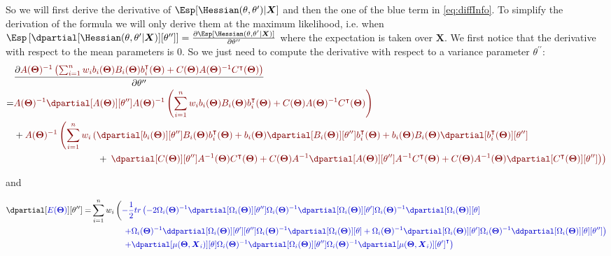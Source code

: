 \documentclass[12pt]{article}
\newcommand{\darkblue}{blue!80!black}
\newcommand{\darkred}{red!50!black}
\newcommand\trans[1]{{#1}^\intercal}%
\newcommand{\param}{\Theta}
\newcommand{\Vparam}{\boldsymbol{\param}}
\newcommand{\VX}{\boldsymbol{X}}
\begin{document}
So we will first derive the derivative of
\(\Esp[\Hessian(\theta,\theta^{\prime})|\VX]\) and then the one of the
blue term in \autoref{eq:diffInfo}.  To simplify the derivation of the
formula we will only derive them at the maximum likelihood, i.e. when
\(\Esp\left[\dpartial[\Hessian(\theta,\theta^{\prime}|\VX)][\theta^{\prime\prime}]\right]=\frac{\partial
\Esp[\Hessian(\theta,\theta^{\prime}|\VX)]}{\partial
\theta^{\prime\prime}}\) where the expectation is taken over
\(\VX\). We first notice that the derivative with respect to the mean
parameters is 0. So we just need to compute the derivative with
respect to a variance parameter \(\theta^{\prime\prime}\):
\begin{align*}
 & \frac{\partial \textcolor{\darkred}{ A(\Vparam)^{-1} \left(\sum_{i=1}^n w_i b_i(\Vparam) B_i(\Vparam) \trans{b}_i(\Vparam) + C(\Vparam)A(\Vparam)^{-1} \trans{C}(\Vparam) \right)}}{\partial \theta^{\prime\prime}} \\
 =& \textcolor{\darkred}{A(\Vparam)^{-1} \dpartial[A(\Vparam)][\theta^{\prime\prime}] A(\Vparam)^{-1} \left(\sum_{i=1}^n w_i b_i(\Vparam) B_i(\Vparam) \trans{b}_i(\Vparam) + C(\Vparam)A(\Vparam)^{-1} \trans{C}(\Vparam) \right)} \\
 & +\textcolor{\darkred}{A(\Vparam)^{-1} \left(\sum_{i=1}^n w_i \left(
 \dpartial[b_i(\Vparam)][\theta^{\prime\prime}]  B_i(\Vparam) \trans{b}_i(\Vparam)
 + b_i(\Vparam) \dpartial[B_i(\Vparam)][\theta^{\prime\prime}]   \trans{b}_i(\Vparam)
 + b_i(\Vparam) B_i(\Vparam) \dpartial[\trans{b}_i(\Vparam)][\theta^{\prime\prime}] \right. \right. } \\
& \qquad \qquad \qquad \qquad \quad + \textcolor{\darkred}{\left. \left.
 \dpartial[C(\Vparam)][\theta^{\prime\prime}]  A^{-1}(\Vparam) \trans{C}(\Vparam)
 + C(\Vparam) A^{-1}\dpartial[A(\Vparam)][\theta^{\prime\prime}]A^{-1}   \trans{C}(\Vparam)
 + C(\Vparam) A^{-1}(\Vparam) \dpartial[\trans{C}(\Vparam)][\theta^{\prime\prime}]
\right) \right)}
\end{align*}

and

\begin{align*}
 \dpartial[\textcolor{\darkblue}{E(\Vparam)}][\theta^{\prime\prime}]=&
 \sum_{i=1}^n w_i \left( \textcolor{\darkblue}{
- \frac{1}{2} tr\left(
-2\Omega_i(\Vparam)^{-1} \dpartial[\Omega_i(\Vparam)][\theta^{\prime\prime}] \Omega_i(\Vparam)^{-1} \dpartial[\Omega_i(\Vparam)][\theta^{\prime}] \Omega_i(\Vparam)^{-1} \dpartial[\Omega_i(\Vparam)][\theta] \right. } \right. \\
& \qquad \qquad \textcolor{\darkblue}{\left. + \Omega_i(\Vparam)^{-1} \ddpartial[\Omega_i(\Vparam)][\theta^{\prime}][\theta^{\prime\prime}] \Omega_i(\Vparam)^{-1} \dpartial[\Omega_i(\Vparam)][\theta]
+ \Omega_i(\Vparam)^{-1} \dpartial[\Omega_i(\Vparam)][\theta^{\prime}] \Omega_i(\Vparam)^{-1} \ddpartial[\Omega_i(\Vparam)][\theta][\theta^{\prime\prime}]
\right)} \\
& \qquad \qquad  \textcolor{\darkblue}{\left. + \dpartial[\mu(\Vparam,\VX_i)][\theta] \Omega_i(\Vparam)^{-1} \dpartial[\Omega_i(\Vparam)][\theta^{\prime\prime}] \Omega_i(\Vparam)^{-1}   \trans{\dpartial[\mu(\Vparam,\VX_i)][\theta^{\prime}]}
 \right)}
\end{align*}
\end{document}

